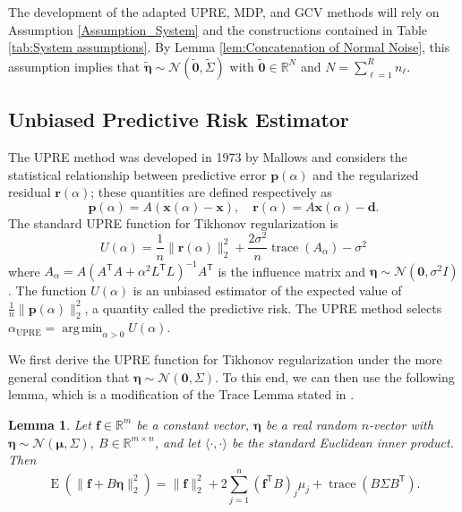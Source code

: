 \documentclass[12pt]{article}
\newcommand{\dVec}{\mathbf{d}}	%
\newcommand{\pVec}{\mathbf{p}}	%
\newcommand{\rVec}{\mathbf{r}}	%
\newcommand{\fVec}{\mathbf{f}}	%
\newcommand{\xVec}{\mathbf{x}}	%
\newcommand{\trans}[1]{{#1}^\mathsf{T}}	%
\DeclareMathOperator{\trace}{trace}		%
\newcommand{\regparam}{\alpha}  %
\newcommand{\xReg}{\xVec(\regparam)}	%
\newcommand{\xSol}{\xVec}	%
\DeclareMathOperator*{\argmin}{arg\,min}
\newcommand{\noise}{\eta}	%
\newcommand{\noiseSD}{\sigma}	%
\newcommand{\noiseVec}{\bm{\noise}}	%
\DeclareMathOperator{\E}{E}	%
\newcommand{\zeroVec}{\bm{0}}	%
\newcommand{\A}{A_{\regparam}}	%
\newcommand{\U}{U}	%
\newtheorem{lemma}{Lemma}[section]
\begin{document}
The development of the adapted UPRE, MDP, and GCV methods will rely on Assumption \ref{Assumption_System} and the constructions contained in Table \ref{tab:System assumptions}. By Lemma \ref{lem:Concatenation of Normal Noise}, this assumption implies that $\widetilde{\noiseVec} \sim \mathcal{N}\left(\widetilde{\zeroVec},\widetilde{\Sigma}\right)$ with $\widetilde{\zeroVec} \in \mathbb{R}^N$ and $N = \sum_{\ell=1}^{R} n_\ell$. 

\subsection{Unbiased Predictive Risk Estimator} \label{sec:UPRE}
The UPRE method was developed in 1973 by Mallows and considers the statistical relationship between predictive error $\pVec(\regparam)$ and the regularized residual $\rVec(\regparam)$; these quantities are defined respectively as
\begin{equation}
\label{eq:Predictive Error and Regularized Residual}
\pVec(\regparam) = A(\xReg - \xSol), \quad \rVec(\regparam) = A\xReg - \dVec.
\end{equation}
The standard UPRE function for Tikhonov regularization is
\begin{equation}
\label{eq:UPRE}
\U(\alpha) = \frac{1}{n}\|\rVec(\regparam)\|_2^2 + \frac{2\noiseSD^2}{n}\trace(A_\regparam) - \noiseSD^2
\end{equation}
where $\A = A(\trans{A}A + \regparam^2\trans{L}L)^{-1}\trans{A}$ is the influence matrix and $\noiseVec \sim \mathcal{N}(\bm{0},\noiseSD^2I)$. The function $\U(\regparam)$ is an unbiased estimator of the expected value of $\frac{1}{n}\|\pVec(\regparam)\|_2^2$, a quantity called the predictive risk. The UPRE method selects $\regparam_{\textrm{UPRE}} = \argmin_{\regparam > 0} \U(\regparam)$. \par
We first derive the UPRE function for Tikhonov regularization under the more general condition that $\noiseVec \sim \mathcal{N}(\bm{0},\Sigma)$. To this end, we can then use the following lemma, which is a modification of the Trace Lemma stated in \cite[p.~98]{Vogel:2002}.
\begin{lemma}
\label{lem:Generalized Trace Lemma}
Let $\fVec \in \mathbb{R}^m$ be a constant vector, $\noiseVec$ be a real random $n$-vector with $\noiseVec \sim \mathcal{N}(\bm{\mu},\Sigma)$, $B \in \mathbb{R}^{m \times n}$, and let $\langle \cdot,\cdot \rangle$ be the standard Euclidean inner product. Then
\[\E(\|\fVec + B\noiseVec\|_2^2) = \|\fVec\|_2^2 + 2\sum_{j=1}^{n} (\trans{\fVec}B)_j \mu_j + \trace\left(B\Sigma\trans{B}\right).\]
\end{lemma}
\end{document}
